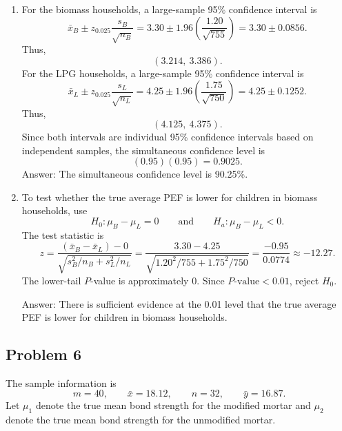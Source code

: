 \documentclass[11pt]{article}
\begin{document}
\begin{enumerate}
\item[(a)] For the biomass households, a large-sample 95\% confidence interval is
\[
\bar{x}_B\pm z_{0.025}\frac{s_B}{\sqrt{n_B}}
=3.30\pm 1.96\left(\frac{1.20}{\sqrt{755}}\right)
=3.30\pm 0.0856.
\]
Thus,
\[
(3.214,\ 3.386).
\]
For the LPG households, a large-sample 95\% confidence interval is
\[
\bar{x}_L\pm z_{0.025}\frac{s_L}{\sqrt{n_L}}
=4.25\pm 1.96\left(\frac{1.75}{\sqrt{750}}\right)
=4.25\pm 0.1252.
\]
Thus,
\[
(4.125,\ 4.375).
\]
Since both intervals are individual 95\% confidence intervals based on independent samples, the simultaneous confidence level is
\[
(0.95)(0.95)=0.9025.
\]
Answer: The simultaneous confidence level is 90.25\%.

\item[(b)] To test whether the true average PEF is lower for children in biomass households, use
\[
H_0:\mu_B-\mu_L=0
\qquad \text{and} \qquad
H_a:\mu_B-\mu_L<0.
\]
The test statistic is
\[
z=\frac{(\bar{x}_B-\bar{x}_L)-0}{\sqrt{s_B^2/n_B+s_L^2/n_L}}
=\frac{3.30-4.25}{\sqrt{1.20^2/755+1.75^2/750}}
=\frac{-0.95}{0.0774}
\approx -12.27.
\]
The lower-tail $P$-value is approximately 0. Since $P\text{-value}<0.01$, reject $H_0$.

Answer: There is sufficient evidence at the 0.01 level that the true average PEF is lower for children in biomass households.
\end{enumerate}

\subsection*{Problem 6}

The sample information is
\[
m=40,
\qquad \bar{x}=18.12,
\qquad n=32,
\qquad \bar{y}=16.87.
\]
Let $\mu_1$ denote the true mean bond strength for the modified mortar and $\mu_2$ denote the true mean bond strength for the unmodified mortar.
\end{document}

